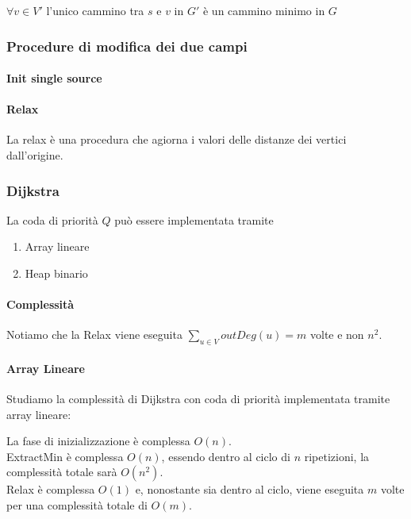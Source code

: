 \documentclass[tikz]{article}
\providecommand{\tightlist}{%
  \setlength{\itemsep}{0pt}\setlength{\parskip}{0pt}}
\let\oldparagraph\paragraph
\renewcommand{\paragraph}[1]{\oldparagraph{#1}\mbox{}}
\begin{document}
{{{$\forall v \in V'$ l'unico cammino tra $s$ e $v$ in $G'$ è un cammino minimo in $G$}

\subsubsection{Procedure di modifica dei due campi}

\paragraph{Init single source}



\paragraph{Relax}

La relax è una procedura che agiorna i valori  delle distanze dei vertici dall'origine.





\subsubsection{Dijkstra}



{La coda di priorità $Q$ può essere implementata tramite}

\begin{enumerate}
\tightlist
\item
  {Array lineare}
\item
  {Heap binario}
\end{enumerate}

\paragraph{Complessità}

Notiamo che la Relax viene eseguita $\sum_{u \in V}{outDeg(u)} = m$ volte e non $n^2$. 

\paragraph{Array Lineare}

{Studiamo la complessità di Dijkstra con coda di priorità implementata tramite array lineare:}

La fase di inizializzazione è complessa $O(n)$. \\
ExtractMin è complessa $O(n)$, essendo dentro al ciclo di $n$ ripetizioni, la complessità totale sarà $O(n^2)$. \\
Relax è complessa $O(1)$ e, nonostante sia dentro al ciclo, viene eseguita $m$ volte per una complessità totale di $O(m)$.

}}
\end{document}
